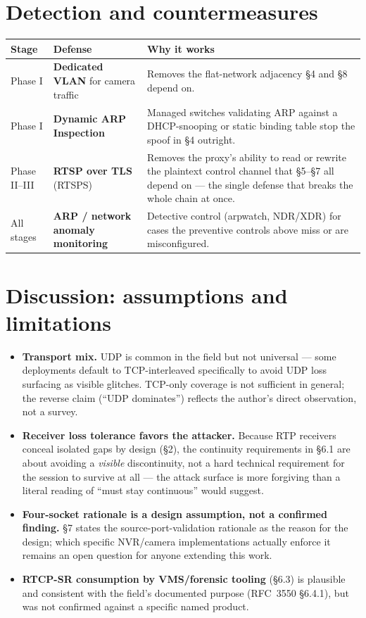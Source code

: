 \documentclass[11pt,a4paper]{article}
\begin{document}
\section{Detection and countermeasures}
\begin{center}
\small
\begin{tabular}{@{}p{1.7cm}p{3.5cm}p{7.8cm}@{}}
\toprule
\textbf{Stage} & \textbf{Defense} & \textbf{Why it works} \\
\midrule
Phase I & \textbf{Dedicated VLAN} for camera traffic & Removes the flat-network adjacency \S4 and \S8 depend on. \\[4pt]
Phase I & \textbf{Dynamic ARP Inspection} & Managed switches validating ARP against a DHCP-snooping or static binding table stop the spoof in \S4 outright. \\[4pt]
Phase II--III & \textbf{RTSP over TLS} (RTSPS) & Removes the proxy's ability to read or rewrite the plaintext control channel that \S5--\S7 all depend on --- the single defense that breaks the whole chain at once. \\[4pt]
All stages & \textbf{ARP / network anomaly monitoring} & Detective control (arpwatch, NDR/XDR) for cases the preventive controls above miss or are misconfigured. \\
\bottomrule
\end{tabular}
\end{center}

\section{Discussion: assumptions and limitations}
\begin{itemize}[leftmargin=1.3em, itemsep=4pt]
\item \textbf{Transport mix.} UDP is common in the field but not universal --- some deployments default to TCP-interleaved specifically to avoid UDP loss surfacing as visible glitches. TCP-only coverage is not sufficient in general; the reverse claim (``UDP dominates'') reflects the author's direct observation, not a survey.
\item \textbf{Receiver loss tolerance favors the attacker.} Because RTP receivers conceal isolated gaps by design (\S2), the continuity requirements in \S6.1 are about avoiding a \emph{visible} discontinuity, not a hard technical requirement for the session to survive at all --- the attack surface is more forgiving than a literal reading of ``must stay continuous'' would suggest.
\item \textbf{Four-socket rationale is a design assumption, not a confirmed finding.} \S7 states the source-port-validation rationale as the reason for the design; which specific NVR/camera implementations actually enforce it remains an open question for anyone extending this work.
\item \textbf{RTCP-SR consumption by VMS/forensic tooling} (\S6.3) is plausible and consistent with the field's documented purpose (RFC~3550 \S6.4.1), but was not confirmed against a specific named product.
\end{itemize}
\end{document}
